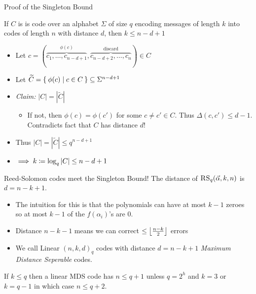\documentclass[aspectratio=169]{beamer}
\begin{document}
\begin{frame}{Proof of the Singleton Bound}
    \begin{thrm}
        If $C$ is is code over an alphabet $\Sigma$ of size $q$ encoding messages of length $k$ into codes of length $n$ with distance $d$, then $k \leq n - d + 1$
    \end{thrm}
    \begin{itemize}
        \item Let $c = (\overbrace{c_1, \ldots, c_{n - d + 1}}^{\phi(c)}, \overbrace{c_{n - d + 2}, \ldots, c_n}^\text{discard}) \in C$ \pause
        \item Let $\widetilde{C} = \Set{\phi(c) | c \in C} \subseteq \Sigma^{n - d + 1}$ 
        \item \emph{Claim:} $|C| = |\widetilde{C}|$
        \begin{itemize}
            \item If not, then $\phi(c) = \phi(c')$ for some $c \neq c' \in C$. \pause 
            Thus $\Delta(c, c') \leq d - 1$. \pause
            Contradicts fact that $C$ has distance $d$!
        \end{itemize} \pause
        \item Thus $|C| = |\widetilde{C}| \leq q^{n - d + 1}$
        \item $\implies k \coloneqq \log_q\abs{C} \leq n - d + 1$
    \end{itemize}
\end{frame}

\begin{frame}
    \begin{thrm}
        Reed-Solomon codes meet the Singleton Bound!
        The distance of $\textsc{RS}_q(\vec{\alpha} , k, n)$ is $d = n - k + 1$.
    \end{thrm} \pause
    \begin{itemize}
        \item The intuition for this is that the polynomials can have at most $k - 1$ zeroes so at most $k - 1$ of the $f(\alpha_i)$'s are $0$. \pause
        \item Distance $n - k - 1$ means we can correct $\leq \left\lfloor \frac{n - k}{2} \right\rfloor$ errors
        \item We call Linear $(n, k, d)_q$ codes with distance $d = n - k + 1$ \emph{Maximum Distance Seperable} codes.\pause
    \end{itemize} 
    \begin{conj}
        If $k \leq q$ then a linear MDS code has $n \leq q + 1$ unless $q = 2^h$ and $k = 3$ or $k = q - 1$ in which case $n \leq q + 2$.
    \end{conj}
\end{frame}
\end{document}
